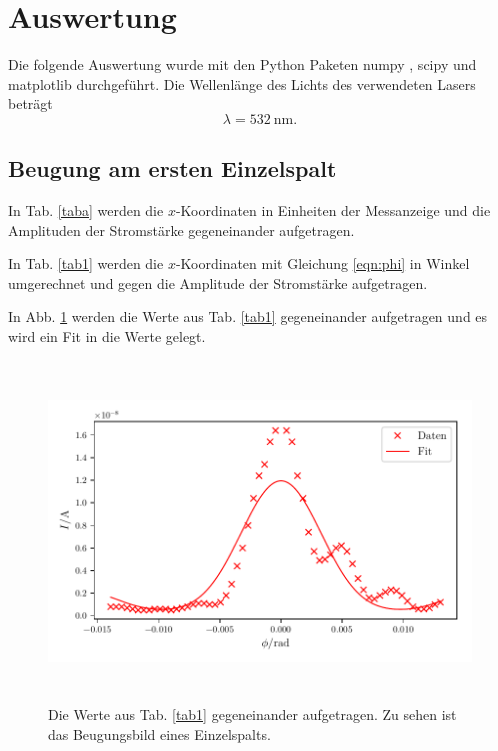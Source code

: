 \section{Auswertung}
\label{sec:Auswertung}

Die folgende Auswertung wurde mit den Python Paketen numpy \cite{numpy}, scipy \cite{scipy} und matplotlib \cite{matplotlib} durchgeführt. 
\newline
Die Wellenlänge des Lichts des verwendeten Lasers beträgt
\begin{equation*}
    \lambda = \SI{532}{\nano\meter}.
\end{equation*}
\subsection{Beugung am ersten Einzelspalt}
In Tab. \ref{taba} werden die $x$-Koordinaten in Einheiten der Messanzeige und die Amplituden der Stromstärke gegeneinander aufgetragen. 



\noindent In Tab. \ref{tab1} werden die $x$-Koordinaten mit Gleichung \eqref{eqn:phi} in Winkel umgerechnet und gegen die Amplitude der Stromstärke aufgetragen.



\noindent  In Abb. \ref{fig:plot1} werden die Werte aus Tab. \ref{tab1} gegeneinander aufgetragen und es wird ein Fit in die Werte gelegt. 

\begin{figure}
    \centering
    \includegraphics[width=15cm, height=9cm]{build/plot1.pdf}
    \caption{Die Werte aus Tab. \ref{tab1} gegeneinander aufgetragen.
    Zu sehen ist das Beugungsbild eines Einzelspalts.}
    \label{fig:plot1}
\end{figure}

